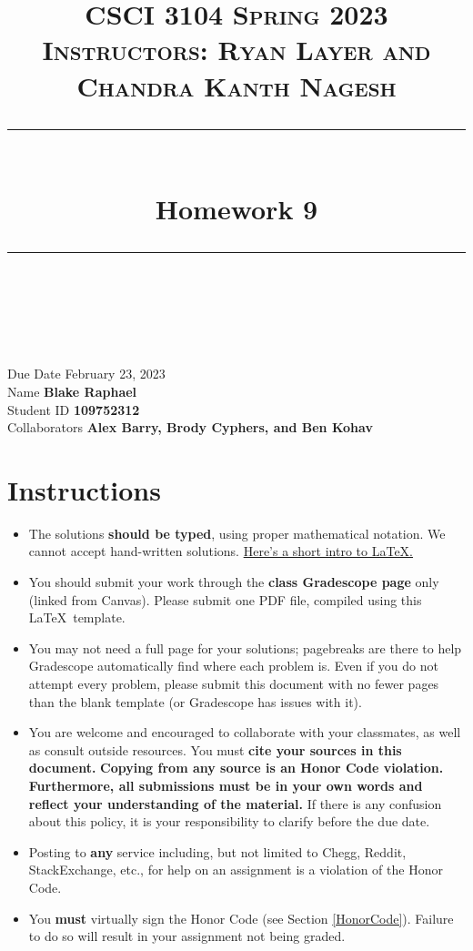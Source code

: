 \documentclass[11pt]{article}
\title{
\normalfont \normalsize 
\textsc{CSCI 3104 Spring 2023 \\ 
Instructors: Ryan Layer and Chandra Kanth Nagesh} \\
[10pt] 
\rule{\linewidth}{0.5pt} \\[6pt] 
\huge Homework 9 \\
\rule{\linewidth}{2pt}  \\[10pt]
}
\date{}
\theoremstyle{definition}
\theoremstyle{definition}
\theoremstyle{definition}
\begin{document}

\maketitle


\noindent
Due Date \dotfill February 23, 2023 \\
Name \dotfill \textbf{Blake Raphael} \\
Student ID \dotfill \textbf{109752312} \\
Collaborators \dotfill \textbf{Alex Barry, Brody Cyphers, and Ben Kohav}

\tableofcontents

\section{Instructions}
 \begin{itemize}
	\item The solutions \textbf{should be typed}, using proper mathematical notation. We cannot accept hand-written solutions. \href{http://ece.uprm.edu/~caceros/latex/introduction.pdf}{Here's a short intro to \LaTeX.}
	\item You should submit your work through the \textbf{class Gradescope page} only (linked from Canvas). Please submit one PDF file, compiled using this \LaTeX \ template.
	\item You may not need a full page for your solutions; pagebreaks are there to help Gradescope automatically find where each problem is. Even if you do not attempt every problem, please submit this document with no fewer pages than the blank template (or Gradescope has issues with it).

	\item You are welcome and encouraged to collaborate with your classmates, as well as consult outside resources. You must \textbf{cite your sources in this document.} \textbf{Copying from any source is an Honor Code violation. Furthermore, all submissions must be in your own words and reflect your understanding of the material.} If there is any confusion about this policy, it is your responsibility to clarify before the due date. 

	\item Posting to \textbf{any} service including, but not limited to Chegg, Reddit, StackExchange, etc., for help on an assignment is a violation of the Honor Code.

	\item You \textbf{must} virtually sign the Honor Code (see Section \ref{HonorCode}). Failure to do so will result in your assignment not being graded.
\end{itemize}
\end{document}

